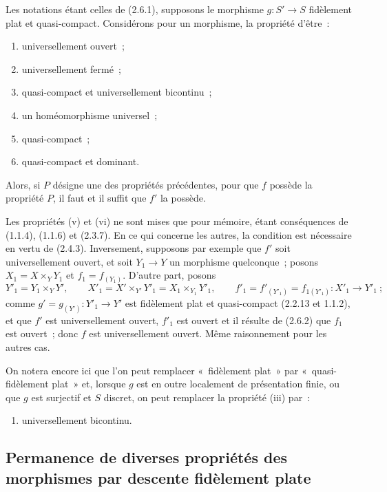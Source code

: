 \begin{corollary}[2.6.4]
\label{IV.2.6.4-fr}
Les notations étant celles de (2.6.1), supposons le morphisme $g:S'\to S$
fidèlement plat et quasi-compact. Considérons pour un morphisme, la propriété
d'être~:
\begin{enumerate}
\item[(i)] universellement ouvert~;
\item[(ii)] universellement fermé~;
\item[(iii)] quasi-compact et universellement bicontinu~;
\item[(iv)] un homéomorphisme universel~;
\item[(v)] quasi-compact~;
\item[(vi)] quasi-compact et dominant.
\end{enumerate}
Alors, si $P$ désigne une des propriétés précédentes, pour que $f$ possède la
propriété $P$, il faut et il suffit que $f'$ la possède.
\end{corollary}

Les propriétés (v) et (vi) ne sont mises que pour mémoire, étant conséquences
de (1.1.4), (1.1.6) et (2.3.7). En ce qui concerne les autres, la condition
est nécessaire en vertu de (2.4.3). Inversement, supposons par exemple que
$f'$ soit universellement ouvert, et soit $Y_1\to Y$ un morphisme
quelconque~; posons $X_1=X\times_Y Y_1$ et $f_1=f_{(Y_1)}$. D'autre part,
posons
\[
Y'_1=Y_1\times_Y Y',\qquad
X'_1=X'\times_{Y'}Y'_1=X_1\times_{Y_1}Y'_1,
\qquad f'_1=f'_{(Y'_1)}=f_{1(Y'_1)}:X'_1\to Y'_1~;
\]
comme $g'=g_{(Y')}:Y'_1\to Y'$ est fidèlement plat et quasi-compact
(2.2.13 et 1.1.2), et que $f'$ est universellement ouvert, $f'_1$ est ouvert
et il résulte de (2.6.2) que $f_1$ est ouvert~; donc $f$ est universellement
ouvert. Même raisonnement pour les autres cas.

On notera encore ici que l'on peut remplacer «~fidèlement plat~» par
«~quasi-fidèlement plat~» et, lorsque $g$ est en outre localement de
présentation finie, ou que $g$ est surjectif et $S$ discret, on peut remplacer
la propriété (iii) par~:
\begin{enumerate}
\item[(iii \emph{bis})] universellement bicontinu.
\end{enumerate}

\subsection{Permanence de diverses propriétés des morphismes par descente
fidèlement plate}
\label{subsection:IV.2.7-fr}

